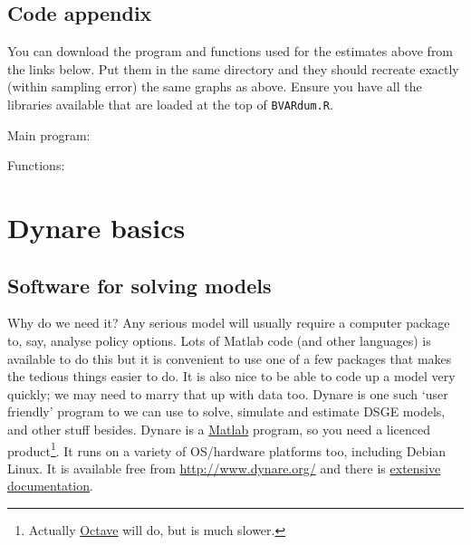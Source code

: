 \documentclass[
  letterpaper,
]{book}
\begin{document}
\hypertarget{code-appendix}{%
\section{Code appendix}\label{code-appendix}}

You can download the program and functions used for the estimates above
from the links below. Put them in the same directory and they should
recreate exactly (within sampling error) the same graphs as above.
Ensure you have all the libraries available that are loaded at the top
of \texttt{BVARdum.R}.

Main program:

Functions:

\hypertarget{dynare-basics}{%
\chapter{Dynare basics}\label{dynare-basics}}

\hypertarget{software-for-solving-models}{%
\section{Software for solving
models}\label{software-for-solving-models}}

Why do we need it? Any serious model will usually require a computer
package to, say, analyse policy options. Lots of Matlab code (and other
languages) is available to do this but it is convenient to use one of a
few packages that makes the tedious things easier to do. It is also nice
to be able to code up a model very quickly; we may need to marry that up
with data too. Dynare is one such `user friendly' program to we can use
to solve, simulate and estimate DSGE models, and other stuff besides.
Dynare is a \href{https://uk.mathworks.com/products/matlab.html}{Matlab}
program, so you need a licenced product\footnote{Actually
  \href{https://octave.org/}{Octave} will do, but is much slower.}. It
runs on a variety of OS/hardware platforms too, including Debian Linux.
It is available free from \url{http://www.dynare.org/} and there is
\href{http://www.dynare.org/wp-repo/dynarewp001.pdf}{extensive
documentation}.
\end{document}
